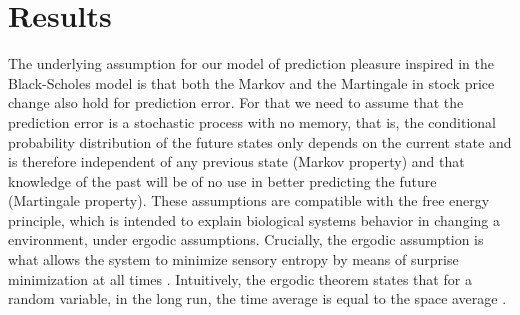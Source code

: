 \documentclass[11pt,twocolumn]{article}
\begin{document}

\section{Results}
\label{se:re}

The underlying assumption for our model of prediction pleasure inspired in the Black-Scholes model   is that both the Markov and the Martingale in stock price change also hold for prediction error. For that we need to assume that the prediction error is a stochastic process with no memory, that is, the conditional probability distribution of the future states only depends on the current state and is therefore independent of any previous state (Markov property) and that knowledge of the past will be of no use in better predicting the future (Martingale property). These assumptions are compatible with the free energy principle, which is intended to explain biological systems behavior in changing a environment, under ergodic assumptions. Crucially, the ergodic assumption is what allows the system to minimize sensory entropy by means of surprise minimization at all times \citep{friston_action_2010}. Intuitively, the ergodic theorem states that for a random variable, in the long run, the time average is equal to the space average \citep{birkhoff_proof_1931}.
\end{document}
